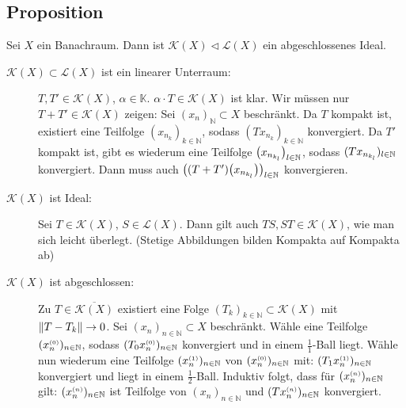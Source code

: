 \subsection[Proposition: Die Menge der kompakten Operatoren ist ein abgeschlossenes Ideal in $\mathcal{L}(X)$]{Proposition} %
\label{sub:89}
Sei $X$ ein Banachraum. Dann ist $\mathcal{K}(X) \lhd \mathcal{L}(X)$ ein abgeschlossenes Ideal.
\begin{description}
	\item[$\mathcal{K}(X) \subset \mathcal{L}(X)$ ist ein linearer Unterraum:] $T,T' \in \mathcal{K}(X)$, $\alpha \in \mathds{K}$. $\alpha \cdot T \in \mathcal{K}(X)$ ist 
	klar. Wir müssen nur $T+T' \in \mathcal{K}(X)$ zeigen: Sei $(x_n)_\mathds{N} \subset X$ beschränkt. Da $T$ kompakt ist, existiert eine Teilfolge 
	$(x_{n_k})_{k \in \mathds{N}}$, sodass $(T x_{n_k})_{k \in \mathds{N}}$ konvergiert. Da $T'$ kompakt ist, gibt es wiederum eine Teilfolge 
	$\enbrace[\big]{\cramped{x_{n_{k_l}}}}_{l \in \mathds{N}}$, sodass $\enbrace{T x_{n_{k_l}}}_{l \in \mathds{N}}$ konvergiert. Dann muss auch 
	$\enbrace[\big]{(T+T')\enbrace[\big]{x_{n_{k_l}}}}_{l \in \mathds{N}}$ konvergieren.
	\item[$\mathcal{K}(X)$ ist Ideal:] Sei $T \in \mathcal{K}(X)$, $S \in \mathcal{L}(X)$. Dann gilt auch $TS, ST \in \mathcal{K}(X)$, wie man sich leicht überlegt. (Stetige 
	Abbildungen bilden Kompakta auf Kompakta ab)
	\item[$\mathcal{K}(X)$ ist abgeschlossen:] Zu $T \in \overline{\mathcal{K}(X)}$ existiert eine Folge $(T_k)_{k \in \mathds{N}} \subset \mathcal{K}(X)$ mit
	$\norm{T-T_k} \to 0$. Sei $(x_n)_{n \in \mathds{N}} \subset X$ beschränkt. Wähle eine Teilfolge $(x_n^\ssbrace{0})_{n \in \mathds{N}}$, sodass 
	$(T_0 x_n^\ssbrace{0})_{n \in \mathds{N}}$ konvergiert und in einem $\frac{1}{1}$-Ball liegt. Wähle nun wiederum eine Teilfolge $(x_n^\ssbrace{1})_{n \in \mathds{N}}$ von
	$(x_n^\ssbrace{0})_{n \in \mathds{N}}$ mit: $(T_1 x_n^\ssbrace{1})_{n \in \mathds{N}}$ konvergiert und liegt in einem $\frac{1}{2}$-Ball. Induktiv folgt, dass
	für $(x_n^\ssbrace{n})_{n \in \mathds{N}}$ gilt: $(x_n^\ssbrace{n})_{n \in \mathds{N}}$ ist Teilfolge von $(x_n)_{n \in \mathds{N}}$ und 
	$(Tx_n^\ssbrace{n})_{n \in \mathds{N}}$ konvergiert. \bewende
\end{description}

